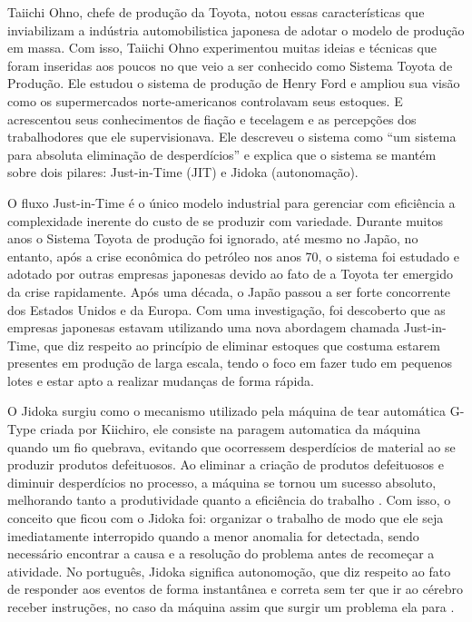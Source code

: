 Taiichi Ohno, chefe de produção da Toyota, notou essas características que inviabilizam a indústria automobilistica japonesa de adotar o modelo de produção em massa. Com isso, Taiichi Ohno experimentou muitas ideias e técnicas que foram inseridas aos poucos no que veio a ser conhecido como Sistema Toyota de Produção. Ele estudou o sistema de produção de Henry Ford e ampliou sua visão como os supermercados norte-americanos controlavam seus estoques. E acrescentou seus conhecimentos de fiação e tecelagem e as percepções dos trabalhodores que ele supervisionava. Ele descreveu o sistema como “um sistema para absoluta eliminação de desperdícios” e explica que o sistema se mantém sobre dois pilares: Just-in-Time (JIT) e Jidoka (autonomação). 

O fluxo Just-in-Time é o único modelo industrial para gerenciar com eficiência a complexidade inerente do custo de se produzir com variedade. Durante muitos anos o Sistema Toyota de produção foi ignorado, até mesmo no Japão, no entanto, após a crise econômica do petróleo nos anos 70, o sistema foi estudado e adotado por outras empresas japonesas devido ao fato de a Toyota ter emergido da crise rapidamente. Após uma década, o Japão passou a ser forte concorrente dos Estados Unidos e da Europa. Com uma investigação, foi descoberto que as empresas japonesas estavam utilizando uma nova abordagem chamada Just-in-Time, que diz respeito ao princípio de eliminar estoques que costuma estarem presentes em produção de larga escala, tendo o foco em fazer tudo em pequenos lotes e estar apto a realizar mudanças de forma rápida. 

O Jidoka surgiu como o mecanismo utilizado pela máquina de tear automática G-Type criada por Kiichiro, ele consiste na paragem automatica da máquina quando um fio quebrava, evitando que ocorressem desperdícios de material ao se produzir produtos defeituosos. Ao eliminar a criação de produtos defeituosos e diminuir desperdícios no processo, a máquina se tornou um sucesso absoluto, melhorando tanto a produtividade quanto a eficiência do trabalho \cite{katayama2010}. Com isso, o conceito que ficou com o Jidoka foi: organizar o trabalho de modo que ele seja imediatamente interropido quando a menor anomalia for detectada, sendo necessário encontrar a causa e a resolução do problema antes de recomeçar a atividade. No português, Jidoka significa autonomoção, que diz respeito ao fato de responder aos eventos de forma instantânea e correta sem ter que ir ao cérebro receber instruções, no caso da máquina assim que surgir um problema ela para \cite{poppendieck}. 

